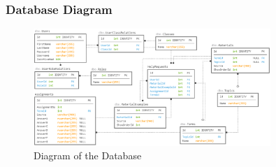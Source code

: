 \subsubsection{Database Diagram}

\missing

\begin{figure}[H]
    \centering
    \includegraphics[width=0.8\textwidth]{figures/database_diagram.png}
    \caption{Diagram of the Database}
    \label{fig:diagram_of_the_database}
\end{figure}
